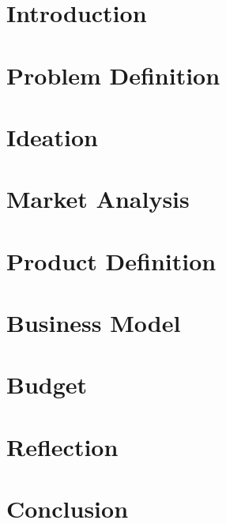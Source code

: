 \documentclass[11pt, a4paper]{article}
\begin{document}
\setcounter{page}{1}
\begin{multicols}{2}



\section{Introduction}
\label{sec:intro}


\section{Problem Definition}
\label{sec:problemDefinition}


\section{Ideation}
\label{sec:ideation}


\section{Market Analysis}
\label{sec:marketanlysis}


\newpage 
\section{Product Definition}
\label{sec:productDefinition}


\section{Business Model}
\label{sec:businessModel}


\section{Budget}
\label{sec:budget}

\newpage

\section{Reflection}
\label{sec:reflection}


\columnbreak

\section{Conclusion}
\label{sec:conclusion}

\label{end}

\end{multicols}
\end{document}
